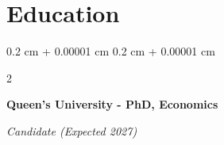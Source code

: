 \documentclass[10pt, a4paper]{article}
\newenvironment{highlightsforbulletentries}{
    \begin{itemize}[
        topsep=0.10 cm,
        parsep=0.10 cm,
        partopsep=0pt,
        itemsep=0pt,
        leftmargin=10pt
    ]
}{
    \end{itemize}
} %
\newenvironment{onecolentry}{
    \begin{adjustwidth}{
        0.2 cm + 0.00001 cm
    }{
        0.2 cm + 0.00001 cm
    }
}{
    \end{adjustwidth}
} %
\newenvironment{twocolentry}[2][]{
    \onecolentry
    \def\secondColumn{#2}
    \setcolumnwidth{\fill, 4.5 cm}
    \begin{paracol}{2}
}{
    \switchcolumn \raggedleft \secondColumn
    \end{paracol}
    \endonecolentry
} %
\let\hrefWithoutArrow\href
\renewcommand{\href}[2]{\hrefWithoutArrow{#1}{\ifthenelse{\equal{#2}{}}{ }{#2 }\raisebox{.15ex}{\footnotesize \faExternalLink*}}}
\begin{document}

    \section{Education}

        \begin{twocolentry}{
            
            
        \textit{Candidate (Expected 2027)}}
            \textbf{Queen's University - PhD, Economics}
        \end{twocolentry}
\end{document}
